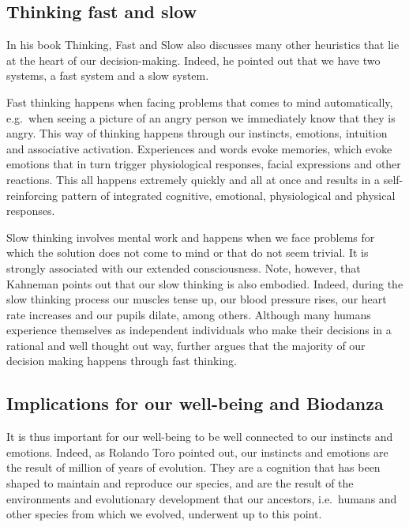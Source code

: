 \documentclass[
  11pt,
]{book}
\begin{document}
\hypertarget{thinking-fast-and-slow}{%
\subsection{Thinking fast and slow}\label{thinking-fast-and-slow}}

In his book Thinking, Fast and Slow \citet{Kahneman2012} also discusses many other heuristics that lie at the heart of our decision-making. Indeed, he pointed out that we have two systems, a fast system and a slow system.

Fast thinking happens when facing problems that comes to mind automatically, e.g.~when seeing a picture of an angry person we immediately know that they is angry. This way of thinking happens through our instincts, emotions, intuition and associative activation. Experiences and words evoke memories, which evoke emotions that in turn trigger physiological responses, facial expressions and other reactions. This all happens extremely quickly and all at once and results in a self-reinforcing pattern of integrated cognitive, emotional, physiological and physical responses.

Slow thinking involves mental work and happens when we face problems for which the solution does not come to mind or that do not seem trivial. It is strongly associated with our extended consciousness. Note, however, that Kahneman points out that our slow thinking is also embodied. Indeed, during the slow thinking process our muscles tense up, our blood pressure rises, our heart rate increases and our pupils dilate, among others. Although many humans experience themselves as independent individuals who make their decisions in a rational and well thought out way, \citet{Kahneman2012} further argues that the majority of our decision making happens through fast thinking.

\hypertarget{implications-for-our-well-being-and-biodanza}{%
\subsection{Implications for our well-being and Biodanza}\label{implications-for-our-well-being-and-biodanza}}

It is thus important for our well-being to be well connected to our instincts and emotions. Indeed, as Rolando Toro pointed out, our instincts and emotions are the result of million of years of evolution. They are a cognition that has been shaped to maintain and reproduce our species, and are the result of the environments and evolutionary development that our ancestors, i.e.~humans and other species from which we evolved, underwent up to this point.
\end{document}

